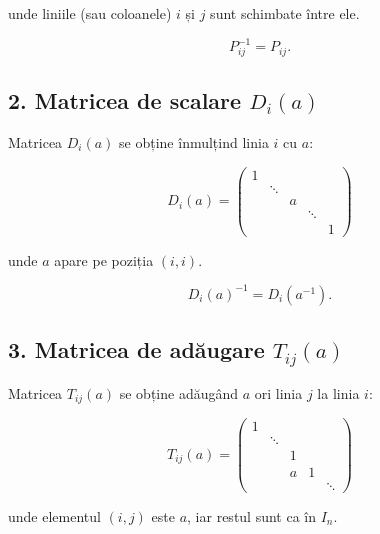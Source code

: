 \documentclass[12pt]{article}
\theoremstyle{definition}
\theoremstyle{plain}
\begin{document}
unde liniile (sau coloanele) $i$ și $j$ sunt schimbate între ele.



\[
P_{ij}^{-1} = P_{ij}.
\]



\subsection*{2. Matricea de scalare $D_i(a)$}

Matricea $D_i(a)$ se obține înmulțind linia $i$ cu $a$:



\[
D_i(a) =
\begin{pmatrix}
1      &        &        &        &        \\
       & \ddots &        &        &        \\
       &        & a      &        &        \\
       &        &        & \ddots &        \\
       &        &        &        & 1
\end{pmatrix}
\]



unde $a$ apare pe poziția $(i,i)$.



\[
D_i(a)^{-1} = D_i(a^{-1}).
\]



\subsection*{3. Matricea de adăugare $T_{ij}(a)$}

Matricea $T_{ij}(a)$ se obține adăugând $a$ ori linia $j$ la linia $i$:



\[
T_{ij}(a) =
\begin{pmatrix}
1      &        &        &        &        \\
       & \ddots &        &        &        \\
       &        & 1      &        &        \\
       &        & a      & 1      &        \\
       &        &        &        & \ddots
\end{pmatrix}
\]



unde elementul $(i,j)$ este $a$, iar restul sunt ca în $I_n$.
\end{document}
